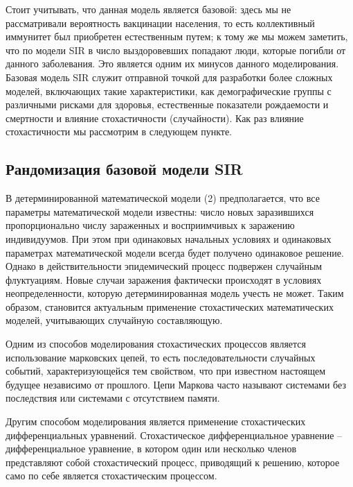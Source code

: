 \documentclass[a4paper, 12pt]{extarticle}
\numberwithin{equation}{section}
\begin{document}
	Стоит учитывать, что данная модель является
	базовой: здесь мы не рассматривали вероятность вакцинации населения, то есть коллективный иммунитет был приобретен естественным путем; к тому же мы можем заметить, что по модели SIR в число выздоровевших попадают люди, которые погибли от данного заболевания. Это является одним их минусов
	данного моделирования. Базовая модель SIR служит отправной точкой для разработки более сложных моделей, включающих такие характеристики, как демографические группы с различными рисками
	для здоровья, естественные показатели
	рождаемости и смертности и влияние стохастичности (случайности). Как раз влияние стохастичности мы рассмотрим в следующем пункте. 
	
	\subsection{Рандомизация базовой модели SIR}
	В детерминированной математической модели (2) предполагается, что все
	параметры математической модели известны: число новых заразившихся пропорционально числу зараженных и восприимчивых к заражению индивидуумов.
	При этом при одинаковых начальных условиях и одинаковых параметрах математической модели всегда будет получено одинаковое решение. Однако в действительности эпидемический процесс подвержен случайным флуктуациям. Новые случаи заражения фактически происходят в условиях неопределенности, которую
	детерминированная модель учесть не может. Таким образом, становится
	актуальным применение стохастических математических моделей, учитывающих
	случайную составляющую.
	
	Одним из способов моделирования стохастических процессов является
	использование марковских цепей, то есть последовательности случайных
	событий, характеризующейся тем свойством, что при известном настоящем
	будущее независимо от прошлого. Цепи Маркова часто называют системами
	без последствия или системами с отсутствием памяти. 
	
	Другим способом моделирования является применение стохастических
	дифференциальных уравнений. Стохастическое дифференциальное уравнение -- дифференциальное уравнение, в котором один или несколько членов
	представляют собой стохастический процесс, приводящий к решению, которое
	само по себе является стохастическим процессом.
	
\end{document}
